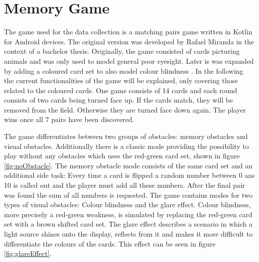 \chapter{Memory Game}
\label{memory_game}


The game used for the data collection is a matching pairs game written in Kotlin for Android devices. The original version was developed by Rafael Miranda \cite{Mir} in the context of a bachelor thesis. Originally, the game consisted of cards picturing animals and was only used to model general poor eyesight. Later is was expanded by adding a coloured card set to also model colour blindness \cite{Markus}. In the following the current functionalities of the game will be explained, only covering those related to the coloured cards. One game consists of 14 cards and each round consists of two cards being turned face up. If the cards match, they will be removed from the field. Otherwise they are turned face down again. The player wins once all 7 pairs have been discovered. 

The game differentiates between two groups of obstacles: memory obstacles and visual obstacles. Additionally there is a classic mode providing the possibility to play without any obstacles which uses the red-green card set, shown in figure \ref{fig:noObstacle}. The memory obstacle mode consists of the same card set and an additional side task: Every time a card is flipped a random number between 0 ans 10 is called out and the player must add all these numbers. After the final pair was found the sum of all numbers is requested. The game contains modes for two types of visual obstacles: Colour blindness and the glare effect. Colour blindness, more precisely a red-green weakness, is simulated by replacing the red-green card set with a brown shifted card set. The glare effect describes a scenario in which a light source shines onto the display, reflects from it and makes it more difficult to differentiate the colours of the cards. This effect can be seen in figure \ref{fig:glareEffect}. 

